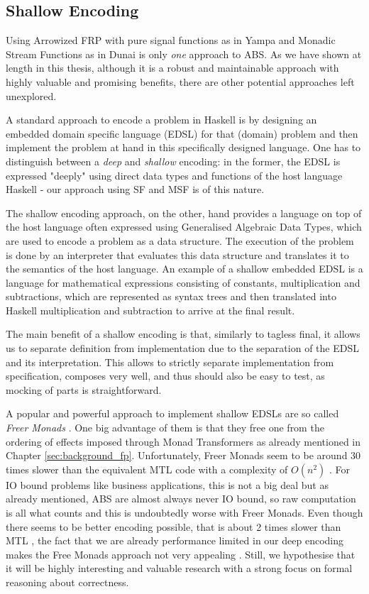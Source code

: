 \subsection{Shallow Encoding}
Using Arrowized FRP with pure signal functions as in Yampa and Monadic Stream Functions as in Dunai is only \textit{one} approach to ABS. As we have shown at length in this thesis, although it is a robust and maintainable approach with highly valuable and promising benefits, there are other potential approaches left unexplored.

A standard approach to encode a problem in Haskell is by designing an embedded domain specific language (EDSL) for that (domain) problem and then implement the problem at hand in this specifically designed language. One has to distinguish between a \textit{deep} and \textit{shallow} encoding: in the former, the EDSL is expressed "deeply" using direct data types and functions of the host language Haskell - our approach using SF and MSF is of this nature.

The shallow encoding approach, on the other, hand provides a language on top of the host language often expressed using Generalised Algebraic Data Types, which are used to encode a problem as a data structure. The execution of the problem is done by an interpreter that evaluates this data structure and translates it to the semantics of the host language. An example of a shallow embedded EDSL is a language for mathematical expressions consisting of constants, multiplication and subtractions, which are represented as syntax trees and then translated into Haskell multiplication and subtraction to arrive at the final result.

The main benefit of a shallow encoding is that, similarly to tagless final, it allows us to separate definition from implementation due to the separation of the EDSL and its interpretation. This allows to strictly separate implementation from specification, composes very well, and thus should also be easy to test, as mocking of parts is straightforward.

\medskip

A popular and powerful approach to implement shallow EDSLs are so called \textit{Freer Monads} \cite{rivas_notions_2014}. One big advantage of them is that they free one from the ordering of effects imposed through Monad Transformers as already mentioned in Chapter \ref{sec:background_fp}. Unfortunately, Freer Monads seem to be around 30 times slower than the equivalent MTL code with a complexity of $O(n^2)$ \cite{maguire_freermonads_better}. For IO bound problems like business applications, this is not a big deal but as already mentioned, ABS are almost always never IO bound, so raw computation is all what counts and this is undoubtedly worse with Freer Monads. Even though there seems to be better encoding possible, that is about 2 times slower than MTL \cite{maguire_freermonads_fast}, the fact that we are already performance limited in our deep encoding makes the Free Monads approach not very appealing \cite{maguire_higherorder_effects}. Still, we hypothesise that it will be highly interesting and valuable research with a strong focus on formal reasoning about correctness.

